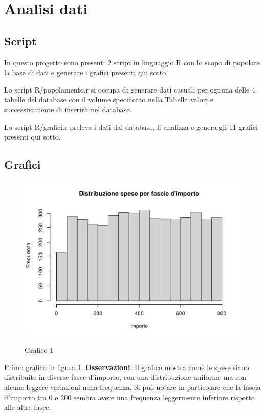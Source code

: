 \section{Analisi dati}
\label{analisiDati}

\subsection{Script}

In questo progetto sono presenti 2 script in linguaggio R con lo scopo di popolare la base di dati e generare i grafici presenti qui sotto.

Lo script R/popolamento.r si occupa di generare dati casuali per ognuna delle 4 tabelle del database con il volume specificato nella \hyperref[tabellaValori]{Tabella valori} e successivamente di inserirli nel database.

Lo script R/grafici.r preleva i dati dal database, li analizza e genera gli 11 grafici presenti qui sotto.

\subsection{Grafici}

\begin{figure}[h]
	\caption{Grafico 1}
	\includegraphics[page=1,width=\textwidth]{../R/grafici.pdf}
	\label{fig1}
\end{figure}

Primo grafico in figura \ref{fig1}. \textbf{Osservazioni}: Il grafico mostra come le spese siano distribuite in diverse fasce d'importo, con una distribuzione uniforme ma con alcune leggere variazioni nella frequenza. Si può notare in particolare che la fascia d'importo tra 0 e 200 sembra avere una frequenza leggermente inferiore rispetto alle altre fasce.

